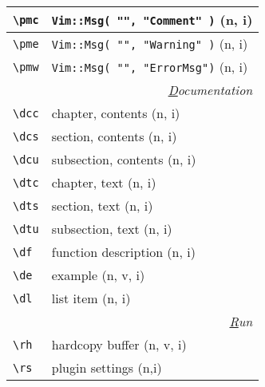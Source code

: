 \documentclass[oneside,10pt,landscape,DIV17]{scrartcl}
\begin{document}
\begin{multicols}{3}
\begin{center}
\begin{tabular}[]{|p{11mm}|p{60mm}|}
\hline \verb'\pmc'  & \texttt{Vim::Msg( "", "Comment" )} \hfill (n, i)\\
\hline \verb'\pme'  & \texttt{Vim::Msg( "", "Warning" )} \hfill (n, i)\\
\hline \verb'\pmw'  & \texttt{Vim::Msg( "", "ErrorMsg")} \hfill (n, i)\\
\hline
\hline
\multicolumn{2}{|r|}{\textsl{\underline{D}ocumentation}}                 \\[1.0ex]
\hline \verb'\dcc' & chapter, contents             \hfill (n, i)\\
\hline \verb'\dcs' & section, contents             \hfill (n, i)\\
\hline \verb'\dcu' & subsection, contents          \hfill (n, i)\\
\hline \verb'\dtc' & chapter, text                 \hfill (n, i)\\
\hline \verb'\dts' & section, text                 \hfill (n, i)\\
\hline \verb'\dtu' & subsection, text              \hfill (n, i)\\
\hline \verb'\df'  & function description          \hfill (n, i)\\
\hline \verb'\de'  & example                       \hfill (n, v, i)\\
\hline \verb'\dl'  & list item                     \hfill (n, i)\\
\hline
\hline
\multicolumn{2}{|r|}{\textsl{\underline{R}un}} \\[1.0ex]
\hline \verb'\rh'    & hardcopy buffer                          \hfill (n, v, i)\\
\hline \verb'\rs'    & plugin settings \hfill (n,i)\\
\hline
\end{tabular}\\
%
%
\end{center}%
\end{multicols}%
%
\end{document}

